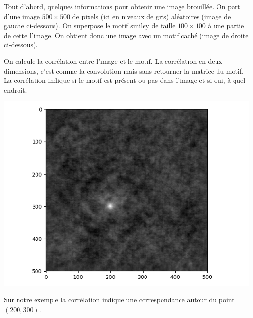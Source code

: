 \documentclass[11pt,class=report,crop=false]{standalone}
\begin{document}
Tout d'abord, quelques informations pour obtenir une image brouillée. On part d'une image $500\times 500$ de pixels (ici en niveaux de gris) aléatoires (image de gauche ci-dessous). On superpose le motif \og{}smiley\fg{} de taille $100 \times 100$ à une partie de cette l'image. On obtient donc une image avec un motif caché (image de droite ci-dessous).

% 
% 
%

\hspace*{-3em}
\begin{minipage}{\textwidth}
\end{minipage}



On calcule la corrélation entre l'image et le motif.
La corrélation en deux dimensions, c'est comme la convolution mais sans retourner la matrice du motif.
La corrélation indique si le motif est présent ou pas dans l'image et si oui, à quel endroit.

\begin{center}
\includegraphics[scale=\myscale,scale=0.5]{figures/correlation2d-4}
\end{center}
Sur notre exemple la corrélation indique une correspondance autour du point $(200,300)$.
\end{document}
